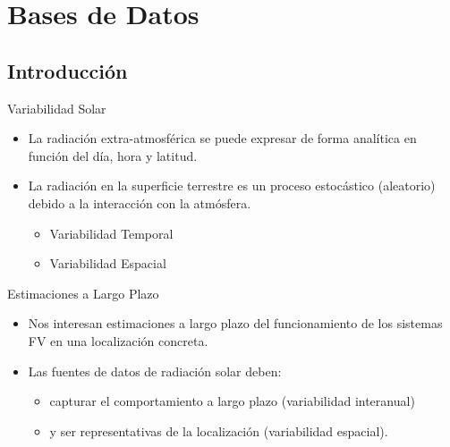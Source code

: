 \documentclass[xcolor={usenames,svgnames,dvipsnames}]{beamer}
\begin{document}
\section{Bases de Datos}
\label{sec:org15aba1d}
\subsection{Introducción}
\label{sec:orga41b819}
\begin{frame}[label={sec:org8505576}]{Variabilidad Solar}
\begin{itemize}
\item La \alert{radiación extra-atmosférica} se puede expresar de forma \alert{analítica} en función del día, hora y latitud.
\item La \alert{radiación en la superficie terrestre} es un \alert{proceso estocástico} (aleatorio) debido a la interacción con la atmósfera.
\begin{itemize}
\item Variabilidad Temporal
\item Variabilidad Espacial
\end{itemize}
\end{itemize}
\end{frame}
\begin{frame}[label={sec:org8497b2b}]{Estimaciones a Largo Plazo}
\begin{itemize}
\item Nos interesan \alert{estimaciones a largo plazo} del funcionamiento de los sistemas FV en una localización concreta.
\item Las fuentes de datos de radiación solar deben:
\begin{itemize}
\item \alert{capturar el comportamiento a largo plazo} (variabilidad interanual)
\item y ser \alert{representativas de la localización} (variabilidad espacial).
\end{itemize}
\end{itemize}
\end{frame}
\end{document}
